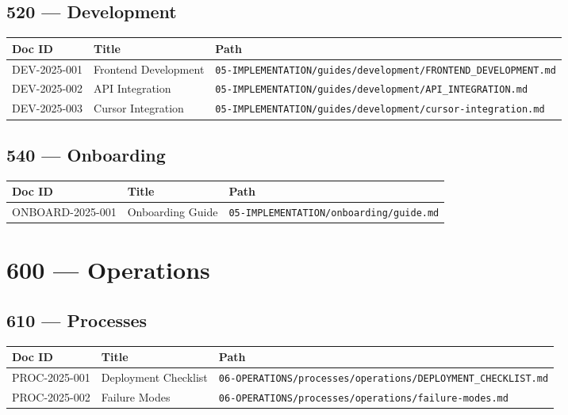 \documentclass[11pt,a4paper]{article}
\begin{document}
\subsection{520 — Development}

\begin{longtable}{p{2cm}p{8cm}p{3cm}}
\toprule
\textbf{Doc ID} & \textbf{Title} & \textbf{Path} \\
\midrule
DEV-2025-001 & Frontend Development & \texttt{05-IMPLEMENTATION/guides/development/FRONTEND\_DEVELOPMENT.md} \\
DEV-2025-002 & API Integration & \texttt{05-IMPLEMENTATION/guides/development/API\_INTEGRATION.md} \\
DEV-2025-003 & Cursor Integration & \texttt{05-IMPLEMENTATION/guides/development/cursor-integration.md} \\
\bottomrule
\end{longtable}

\subsection{540 — Onboarding}

\begin{longtable}{p{2cm}p{8cm}p{3cm}}
\toprule
\textbf{Doc ID} & \textbf{Title} & \textbf{Path} \\
\midrule
ONBOARD-2025-001 & Onboarding Guide & \texttt{05-IMPLEMENTATION/onboarding/guide.md} \\
\bottomrule
\end{longtable}

\section{600 — Operations}

\subsection{610 — Processes}

\begin{longtable}{p{2cm}p{8cm}p{3cm}}
\toprule
\textbf{Doc ID} & \textbf{Title} & \textbf{Path} \\
\midrule
PROC-2025-001 & Deployment Checklist & \texttt{06-OPERATIONS/processes/operations/DEPLOYMENT\_CHECKLIST.md} \\
PROC-2025-002 & Failure Modes & \texttt{06-OPERATIONS/processes/operations/failure-modes.md} \\
\bottomrule
\end{longtable}
\end{document}
